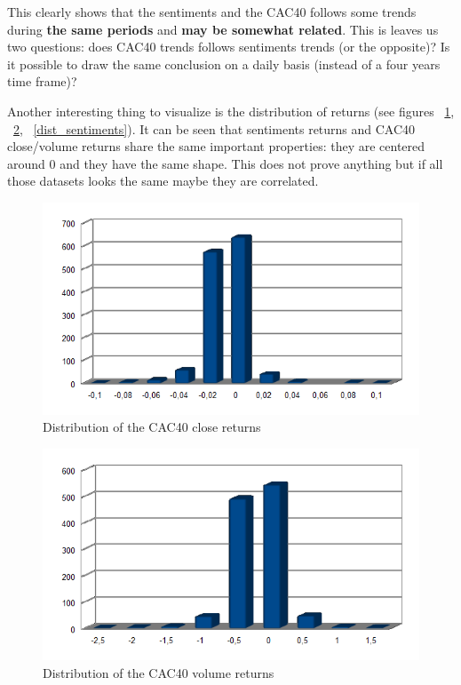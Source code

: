 \documentclass[12pt]{report}
\begin{document}
This clearly shows that the sentiments and the CAC40 follows some trends during \textbf{the same periods} and \textbf{may be somewhat related}. This is leaves us two questions: does CAC40 trends follows sentiments trends (or the opposite)? Is it possible to draw the same conclusion on a daily basis (instead of a four years time frame)?

Another interesting thing to visualize is the distribution of returns (see figures ~\ref{dist_cac}, ~\ref{dist_vol}, ~\ref{dist_sentiments}). It can be seen that sentiments returns and CAC40 close/volume returns share the same important properties: they are centered around 0 and they have the same shape. This does not prove anything but if all those datasets looks the same maybe they are correlated.

\begin{figure}[H]
	\caption{Distribution of the CAC40 close returns\label{dist_cac}}
	\includegraphics{plots/dists/close_return.png}
\end{figure}

\begin{figure}[H]
	\caption{Distribution of the CAC40 volume returns\label{dist_vol}}
	\includegraphics{plots/dists/volume_return.png}
\end{figure}
\end{document}
